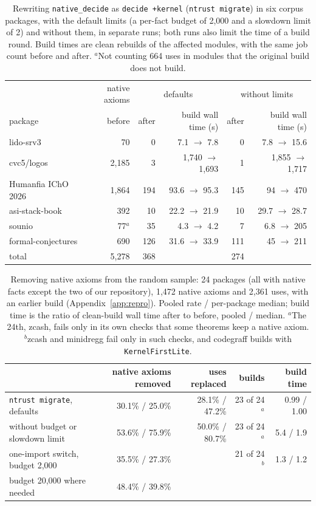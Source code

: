 \documentclass[11pt]{article}
\begin{document}
\begin{table}[t]\centering\small
\begin{tabular}{lrrrrr}\toprule
 & native axioms & \multicolumn{2}{c}{defaults} & \multicolumn{2}{c}{without limits}\\
package & before & after & build wall time (s) & after & build wall time (s)\\\midrule
lido-srv3 & 70 & 0 & 7.1 $\to$ 7.8 & 0 & 7.8 $\to$ 15.6\\
cvc5/logos & 2,185 & 3 & 1,740 $\to$ 1,693 & 1 & 1,855 $\to$ 1,717\\
Humanfia IChO 2026 & 1,864 & 194 & 93.6 $\to$ 95.3 & 145 & 94 $\to$ 470\\
asi-stack-book & 392 & 10 & 22.2 $\to$ 21.9 & 10 & 29.7 $\to$ 28.7\\
sounio & 77$^a$ & 35 & 4.3 $\to$ 4.2 & 7 & 6.8 $\to$ 205\\
formal-conjectures & 690 & 126 & 31.6 $\to$ 33.9 & 111 & 45 $\to$ 211\\\midrule
total & 5,278 & 368 & & 274 & \\\bottomrule
\end{tabular}
\caption{Rewriting \texttt{native\_decide} as \texttt{decide +kernel} (\texttt{ntrust migrate}) in six
corpus packages, with the default limits (a per-fact budget of 2,000 and a slowdown limit of 2) and
without them, in separate runs; both runs also limit the time of a build round. Build times are clean rebuilds of the affected modules, with the same
job count before and after. $^a$Not counting 664 uses in modules that the original build does not build.}\label{tab:migrate}
\end{table}

\begin{table}[t]\centering\small
\begin{tabular}{lrrrr}\toprule
 & native axioms removed & uses replaced & builds & build time\\\midrule
\texttt{ntrust migrate}, defaults & 30.1\% / 25.0\% & 28.1\% / 47.2\% & 23 of 24$^a$ & 0.99 / 1.00\\
\quad without budget or slowdown limit & 53.6\% / 75.9\% & 50.0\% / 80.7\% & 23 of 24$^a$ & 5.4 / 1.9\\
one-import switch, budget 2,000 & 35.5\% / 27.3\% & & 21 of 24$^b$ & 1.3 / 1.2\\
\quad budget 20,000 where needed & 48.4\% / 39.8\% & & & \\\bottomrule
\end{tabular}
\caption{Removing native axioms from the random sample: 24 packages (all with native facts except the two
of our repository), 1,472 native axioms and 2,361 uses, with an earlier build (Appendix~\ref{app:repro}). Pooled
rate / per-package median; build time is the ratio of clean-build wall time after to before, pooled /
median. $^a$The 24th, zcash, fails only in its own checks that some theorems keep a native axiom.
$^b$zcash and minidregg fail only in such checks, and codegraff builds with \texttt{KernelFirstLite}.}\label{tab:removalsample}
\end{table}
\end{document}
